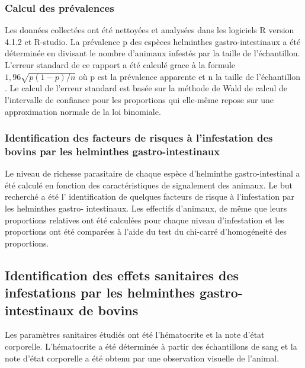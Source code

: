 \subsubsection{Calcul des prévalences}

Les données collectées ont été nettoyées et analysées dans les logiciels R  
version 4.1.2 et R-studio\textsuperscript{\circledR}. La prévalence p des espèces helminthes gastro-intestinaux a été déterminée en divisant le nombre d'animaux infestés par la taille de l'échantillon. L'erreur standard de ce rapport a été calculé grace à la formule 
$ 1,96\sqrt{p(1 - p)/n} $ où p est la prévalence apparente et n la taille de
l'échantillon . Le calcul de l'erreur standard est basée sur la méthode de 
Wald de calcul de l'intervalle de confiance pour les proportions qui elle-même repose sur une 
approximation normale de la loi binomiale.

\subsubsection{Identification des facteurs de risques à l'infestation des bovins par les 
helminthes gastro-intestinaux}
Le niveau de richesse parasitaire de chaque espèce d'helminthe gastro-intestinal a été calculé
en fonction des caractéristiques de signalement des animaux. Le but recherché a été l'
identification de quelques facteurs de risque à l'infestation par les helminthes gastro-
intestinaux. Les effectifs d'animaux, de même que leurs proportions relatives ont été calculées
pour chaque niveau d'infestation et les proportions ont été comparées à l'aide du test du 
chi-carré d'homogéneité des proportions.

\subsection{Identification des effets sanitaires des infestations par les helminthes 
gastro-intestinaux de bovins}
Les paramètres sanitaires étudiés ont été l'hématocrite et la note d'état corporelle.
L'hématocrite a été déterminée à partir des échantillons de sang et la note d'état corporelle 
a été obtenu par une observation visuelle de l'animal.

